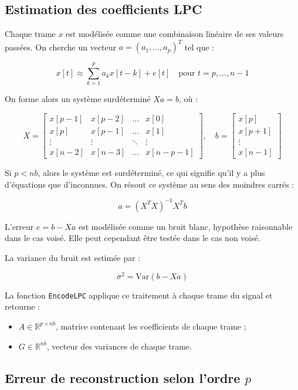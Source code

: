 \documentclass[11pt]{article}
\begin{document}
\subsection{Estimation des coefficients LPC}

Chaque trame \( x \) est modélisée comme une combinaison linéaire de ses valeurs passées. On cherche un vecteur \( a = (a_1, \ldots, a_p)^T \) tel que :

\[
x[t] \approx \sum_{k=1}^{p} a_k x[t - k] + e[t] \quad \text{pour } t = p, \ldots, n-1
\]

On forme alors un système surdéterminé \( Xa = b \), où :

\[
X =
\begin{bmatrix}
x[p-1] & x[p-2] & \dots & x[0] \\
x[p] & x[p-1] & \dots & x[1] \\
\vdots & \vdots & \ddots & \vdots \\
x[n-2] & x[n-3] & \dots & x[n-p-1]
\end{bmatrix}, \quad
b =
\begin{bmatrix}
x[p] \\
x[p+1] \\
\vdots \\
x[n-1]
\end{bmatrix}
\]

Si \( p < nb \), alors le système est surdéterminé, ce qui signifie qu’il y a plus d’équations que d’inconnues. On résout ce système au sens des moindres carrés :

\[
a = (X^T X)^{-1} X^T b
\]

L’erreur \( e = b - Xa \) est modélisée comme un bruit blanc, hypothèse raisonnable dans le cas voisé. Elle peut cependant être testée dans le cas non voisé.

La variance du bruit est estimée par :

\[
\sigma^2 = \text{Var}(b - Xa)
\]

La fonction \texttt{EncodeLPC} applique ce traitement à chaque trame du signal et retourne :
\begin{itemize}
    \item \( A \in \mathbb{R}^{p \times nb} \), matrice contenant les coefficients de chaque trame ;
    \item \( G \in \mathbb{R}^{nb} \), vecteur des variances de chaque trame.
\end{itemize}

\subsection{Erreur de reconstruction selon l'ordre \( p \)}
\end{document}
